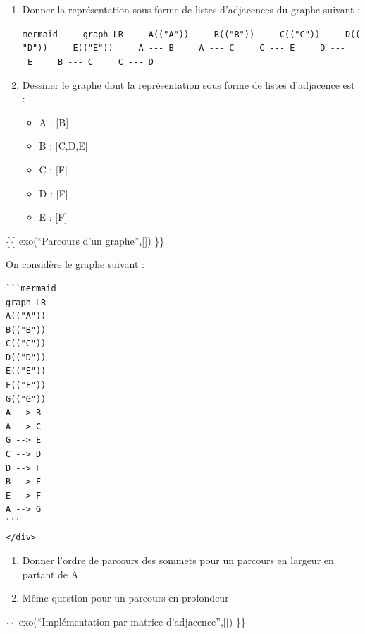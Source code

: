 \documentclass[
  letterpaper,
  DIV=11,
  numbers=noendperiod]{scrartcl}
\providecommand{\tightlist}{%
  \setlength{\itemsep}{0pt}\setlength{\parskip}{0pt}}\usepackage{longtable,booktabs,array}
\begin{document}
\begin{enumerate}
\def\labelenumi{\arabic{enumi}.}
\item
  Donner la représentation sous forme de listes d'adjacences du graphe
  suivant :

  \texttt{mermaid\ \ \ \ \ graph\ LR\ \ \ \ \ A(("A"))\ \ \ \ \ B(("B"))\ \ \ \ \ C(("C"))\ \ \ \ \ D(("D"))\ \ \ \ \ E(("E"))\ \ \ \ \ A\ -\/-\/-\ B\ \ \ \ \ A\ -\/-\/-\ C\ \ \ \ \ C\ -\/-\/-\ E\ \ \ \ \ D\ -\/-\/-\ E\ \ \ \ \ B\ -\/-\/-\ C\ \ \ \ \ C\ -\/-\/-\ D}
\item
  Dessiner le graphe dont la représentation sous forme de listes
  d'adjacence est :

  \begin{itemize}
  \tightlist
  \item
    A : {[}B{]}
  \item
    B : {[}C,D,E{]}
  \item
    C : {[}F{]}
  \item
    D : {[}F{]}
  \item
    E : {[}F{]}
  \end{itemize}
\end{enumerate}

\{\{ exo(``Parcours d'un graphe'',{[}{]}) \}\}

On considère le graphe suivant :

\begin{verbatim}
```mermaid
graph LR
A(("A"))
B(("B"))
C(("C"))
D(("D"))
E(("E"))
F(("F"))
G(("G"))
A --> B
A --> C
G --> E
C --> D
D --> F
B --> E
E --> F
A --> G
```
</div>
\end{verbatim}

\begin{enumerate}
\def\labelenumi{\arabic{enumi}.}
\tightlist
\item
  Donner l'ordre de parcours des sommets pour un parcours en largeur en
  partant de A
\item
  Même question pour un parcours en profondeur
\end{enumerate}

\{\{ exo(``Implémentation par matrice d'adjacence'',{[}{]}) \}\}
\end{document}
